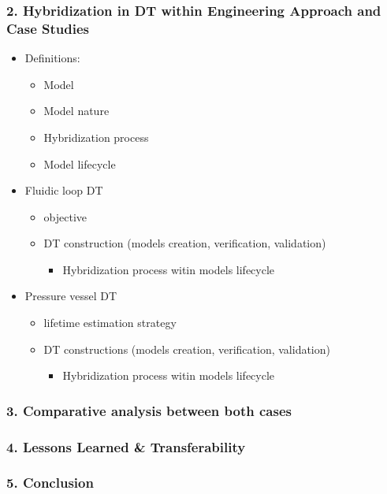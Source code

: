 \documentclass[
]{article}
\providecommand{\tightlist}{%
  \setlength{\itemsep}{0pt}\setlength{\parskip}{0pt}}
\begin{document}
\subsubsection{2. Hybridization in DT within Engineering Approach and
Case
Studies}\label{hybridization-in-dt-within-engineering-approach-and-case-studies}

\begin{itemize}
\tightlist
\item
  Definitions:

  \begin{itemize}
  \tightlist
  \item
    Model
  \item
    Model nature
  \item
    Hybridization process
  \item
    Model lifecycle
  \end{itemize}
\item
  Fluidic loop DT

  \begin{itemize}
  \tightlist
  \item
    objective
  \item
    DT construction (models creation, verification, validation)

    \begin{itemize}
    \tightlist
    \item
      Hybridization process witin models lifecycle
    \end{itemize}
  \end{itemize}
\item
  Pressure vessel DT

  \begin{itemize}
  \tightlist
  \item
    lifetime estimation strategy
  \item
    DT constructions (models creation, verification, validation)

    \begin{itemize}
    \tightlist
    \item
      Hybridization process witin models lifecycle
    \end{itemize}
  \end{itemize}
\end{itemize}

\subsubsection{3. Comparative analysis between both
cases}\label{comparative-analysis-between-both-cases}

\subsubsection{4. Lessons Learned \&
Transferability}\label{lessons-learned-transferability}

\subsubsection{5. Conclusion}\label{conclusion}
\end{document}
